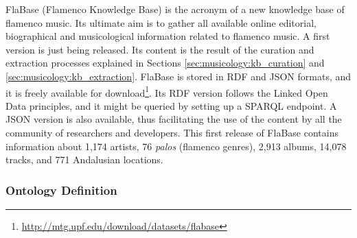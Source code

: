 FlaBase (Flamenco Knowledge Base) is the acronym of a new knowledge base of flamenco music. Its ultimate aim is to gather all available online editorial, biographical and musicological information related to flamenco music. A first version is just being released. Its content is the result of the curation and extraction processes explained in Sections \ref{sec:musicology:kb_curation} and \ref{sec:musicology:kb_extraction}. FlaBase is stored in RDF and JSON formats, and it is freely available for download\footnote{\url{http://mtg.upf.edu/download/datasets/flabase}}. Its RDF version follows the Linked Open Data principles, and it might be queried by setting up a SPARQL endpoint. A JSON version is also available, thus facilitating the use of the content by all the community of researchers and developers. This first release of FlaBase contains information about 1,174 artists, 76 \textit{palos} (flamenco genres), 2,913 albums, 14,078 tracks, and 771 Andalusian locations.


\subsubsection{Ontology Definition}\label{sec:musicology:ontology}

